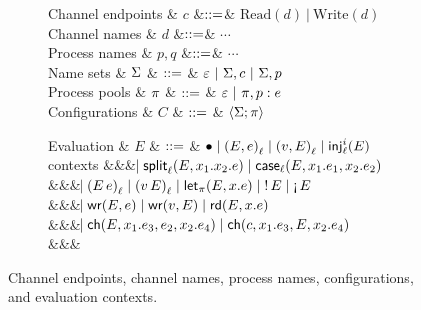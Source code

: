 \begin{figure*}[t]
\centering
\begin{subfigure}{0.48\textwidth}
\begin{grammar}
  Channel endpoints & $c$   &$\bnfas$& $\textrm{Read}(d) ~|~ \textrm{Write}(d)$
  \\
  Channel names & $d$ &$\bnfas$& $\cdots$
  \\  
  Process names & $p,q$ &$\bnfas$& $\cdots$
  \\
  Name sets
  & $\Names$ 
    & $\bnfas$ & $\emptyNames ~|~ \Names, c ~|~ \Names, p$
  \\
  Process pools
  & $\Procs$ 
  & $\bnfas$ & $\emptyProcs ~|~ \Procs, \ProcNm{p} \proc{e}$
  \\
  Configurations
  & $C$
     & $\bnfas$ & $\Config{\Names}{}{\Procs} $
\end{grammar}
\end{subfigure}%
\begin{subfigure}{0.48\textwidth}
  \begin{grammar}
 Evaluation
  & $E$
 & $\bnfas$ &
$\bullet \bnfalt \ePair{E}{e}{\ell} \bnfalt \ePair{v}{E}{\ell} \bnfalt \eInjj{\ell}{i}{E}$ 
\\ contexts &&& $\bnfaltbrk \eSplitt{\ell}{E}{x_1}{x_2}{e} \bnfalt
\eCase{\ell}{E}{x_1}{e_1}{x_2}{e_2}$
\\ &&& $\bnfaltbrk \eApp{E}{e}{\ell} \bnfalt \eApp{v}{E}{\ell}  \bnfalt \eLet{x}{E}{e}
\bnfalt \eBang{E} \bnfalt \eUnbang{E}$
\\ &&& $\bnfaltbrk \eWr{E}{e} \bnfalt \eWr{v}{E} \bnfalt \eLetRd{E}{x}{e}$
\\ &&& $\bnfaltbrk \eChoicee{E}{x_1}{e_3}{e_2}{x_2}{e_4} \bnfalt
\eChoicee{c}{x_1}{e_3}{E}{x_2}{e_4}$
\\ &&&
\end{grammar}
\end{subfigure}
\caption{Channel endpoints, channel names, process names, configurations, and evaluation contexts.}
\label{fig:configs}
\end{figure*}


